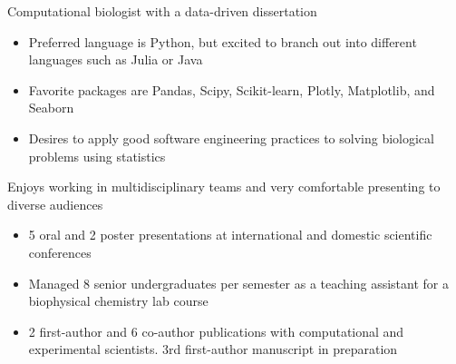 

\begin{cventries}
\vspace{-4.0mm}

  \cventry
    {} %
    {} %
    {} %
    {} %
    {
      \begin{cvitems} %
        \item {Computational biologist with a data-driven dissertation}
        \begin{itemize}
       	 	\item Preferred language is Python, but excited to branch out into different languages such as Julia or Java
       	 	\item Favorite packages are Pandas, Scipy, Scikit-learn, Plotly, Matplotlib, and Seaborn
       	 	\item Desires to apply good software engineering practices to solving biological problems using statistics 
        \end{itemize}
        \vspace{1.0mm}
        \item {Enjoys working in multidisciplinary teams and very comfortable presenting to diverse audiences}
        \begin{itemize}
         	\item 5 oral and 2 poster presentations at international and domestic scientific conferences
         	\item Managed 8 senior undergraduates per semester as a teaching assistant for a biophysical chemistry lab course
         	\item 2 first-author and 6 co-author publications with computational and experimental scientists. 3rd first-author manuscript in preparation
        \end{itemize}
      \end{cvitems}
    }
\vspace{-4.0mm}
\end{cventries}
